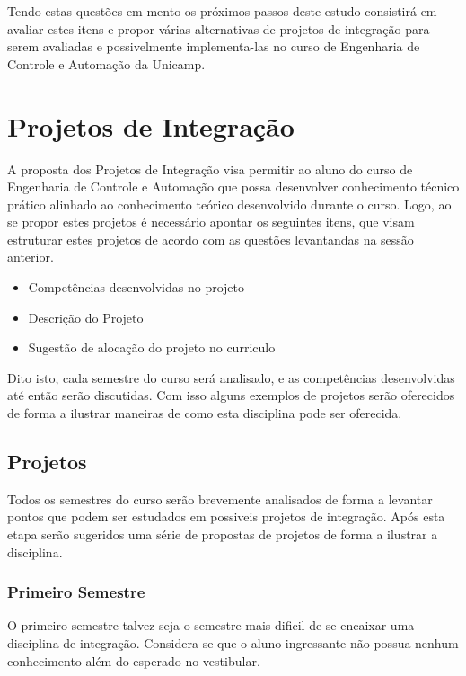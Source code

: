 \documentclass[12pt]{article} %
\begin{document}
Tendo estas questões em mento os próximos passos deste estudo consistirá em avaliar estes itens e propor várias alternativas de projetos de integração para serem avaliadas e possivelmente implementa-las no curso de Engenharia de Controle e Automação da Unicamp.


\section{Projetos de Integração}

A proposta dos Projetos de Integração visa permitir ao aluno do curso de Engenharia de Controle e Automação que possa desenvolver conhecimento técnico prático alinhado ao conhecimento teórico desenvolvido durante o curso. Logo, ao se propor estes projetos é necessário apontar os seguintes itens, que visam estruturar estes projetos de acordo com as questões levantandas na sessão anterior.

\begin{itemize}
\item Competências desenvolvidas no projeto
\item Descrição do Projeto
\item Sugestão de alocação do projeto no curriculo
\end{itemize}

Dito isto, cada semestre do curso será analisado, e as competências desenvolvidas até então serão discutidas. Com isso alguns exemplos de projetos serão oferecidos de forma a ilustrar maneiras de como esta disciplina pode ser oferecida.

\subsection{Projetos}
Todos os semestres do curso serão brevemente analisados de forma a levantar pontos que podem ser estudados em possiveis projetos de integração. Após esta etapa serão sugeridos uma série de propostas de projetos de forma a ilustrar a disciplina.

\subsubsection{Primeiro Semestre}
O primeiro semestre talvez seja o semestre mais dificil de se encaixar uma disciplina de integração. Considera-se que o aluno ingressante não possua nenhum conhecimento além do esperado no vestibular. 
\end{document}
